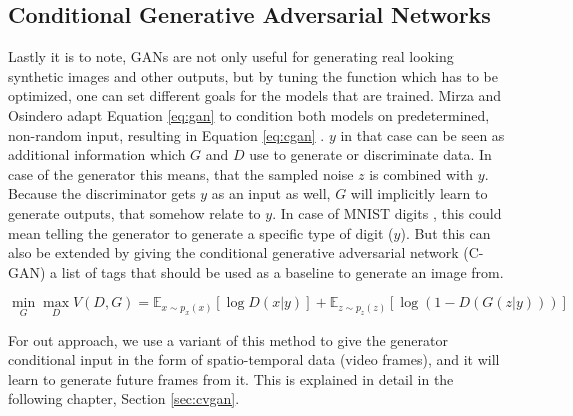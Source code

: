 \subsection{Conditional Generative Adversarial Networks} \label{subsec:cgan}

Lastly it is to note, GANs are not only useful for generating real looking synthetic images and other outputs, but by tuning the function which has to be optimized, one can set different goals for the models that are trained. Mirza and Osindero adapt Equation \ref{eq:gan} to condition both models on predetermined, non-random input, resulting in Equation \ref{eq:cgan} \cite{mirza2014conditional}. $y$ in that case can be seen as additional information which $G$ and $D$ use to generate or discriminate data. In case of the generator this means, that the sampled noise $z$ is combined with $y$. Because the discriminator gets $y$ as an input as well, $G$ will implicitly learn to generate outputs, that somehow relate to $y$. In case of MNIST digits \cite{lecun2010mnist}, this could mean telling the generator to generate a specific type of digit ($y$). But this can also be extended by giving the conditional generative adversarial network (C-GAN) a list of tags that should be used as a baseline to generate an image from.

\begin{equation} \label{eq:cgan}
\min_G \max_D V(D,G) = \mathbb{E}_{x \sim p_x(x)}[\log D(x|y)] + \mathbb{E}_{z \sim p_z(z)}[\log(1 - D(G(z|y)))]
\end{equation}

For out approach, we use a variant of this method to give the generator conditional input in the form of spatio-temporal data (video frames), and it will learn to generate future frames from it. This is explained in detail in the following chapter, Section \ref{sec:cvgan}.